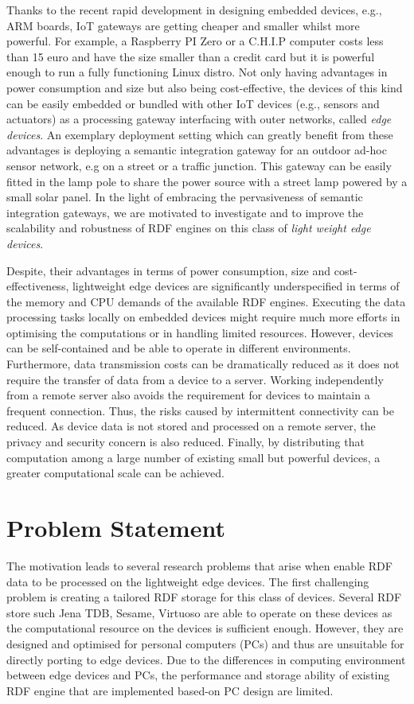 Thanks to the recent rapid development in designing embedded devices, e.g., ARM boards, IoT gateways are getting cheaper and smaller whilst more powerful.
For example, a Raspberry PI Zero or a C.H.I.P computer costs less than 15 euro and have the size smaller than a credit card but it is powerful enough to run a fully functioning Linux distro.
Not only having advantages in power consumption and size but also being cost-effective, the devices of this kind can be easily embedded or bundled with other IoT devices (e.g., sensors and actuators) as a processing gateway interfacing with outer networks, called \emph{edge devices}. 
An exemplary deployment setting which can greatly benefit from these advantages is deploying a semantic integration gateway for an outdoor ad-hoc sensor network, e.g on a street or a traffic junction. 
This gateway can be easily fitted in the lamp pole to share the power source with a street lamp powered by a small solar panel.
In the light of embracing the pervasiveness of semantic integration gateways, we are motivated to investigate and to improve the scalability and robustness of RDF engines on this class of \emph{light weight edge devices}.

Despite, their advantages in terms of power consumption, size and cost-effectiveness, lightweight edge devices are significantly underspecified in terms of the memory and CPU demands of the available RDF engines.
Executing the data processing tasks locally on embedded devices might require much more efforts in optimising the computations or in handling limited resources. 
However, devices can be self-contained and be able to operate in different environments. 
Furthermore, data transmission costs can be dramatically reduced as it does not require the transfer of data from a device to a server. 
Working independently from a remote server also avoids the requirement for devices to maintain a frequent connection. Thus, the risks caused by intermittent connectivity can be reduced.
As device data is not stored and processed on a remote server, the privacy and security concern is also reduced. Finally, by distributing that computation among a large number of existing small but powerful devices, a greater computational scale can be achieved.

\section{Problem Statement}

The motivation leads to several research problems that arise when enable RDF data to be processed on the lightweight edge devices.
The first challenging problem is creating a tailored RDF storage for this class of devices.
Several RDF store such Jena TDB, Sesame, Virtuoso are able to operate on these devices as the computational resource on the devices is sufficient enough.
However, they are designed and optimised for personal computers (PCs) and thus are unsuitable for directly porting to edge devices. 
Due to the differences in computing environment between edge devices and PCs, the performance and storage ability of existing RDF engine that are implemented based-on PC design are limited. 

